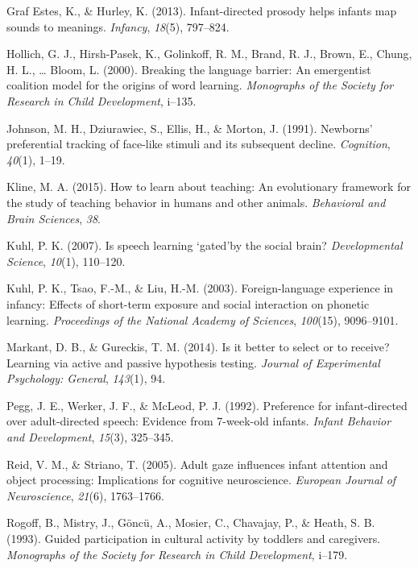 \documentclass[a4paper,man,apacite,floatsintext]{apa6}
\begin{document}
\hypertarget{ref-graf2013infant}{}
Graf Estes, K., \& Hurley, K. (2013). Infant-directed prosody helps
infants map sounds to meanings. \emph{Infancy}, \emph{18}(5), 797--824.

\hypertarget{ref-hollich2000breaking}{}
Hollich, G. J., Hirsh-Pasek, K., Golinkoff, R. M., Brand, R. J., Brown,
E., Chung, H. L., \ldots{} Bloom, L. (2000). Breaking the language
barrier: An emergentist coalition model for the origins of word
learning. \emph{Monographs of the Society for Research in Child
Development}, i--135.

\hypertarget{ref-johnson1991newborns}{}
Johnson, M. H., Dziurawiec, S., Ellis, H., \& Morton, J. (1991).
Newborns' preferential tracking of face-like stimuli and its subsequent
decline. \emph{Cognition}, \emph{40}(1), 1--19.

\hypertarget{ref-kline2015learn}{}
Kline, M. A. (2015). How to learn about teaching: An evolutionary
framework for the study of teaching behavior in humans and other
animals. \emph{Behavioral and Brain Sciences}, \emph{38}.

\hypertarget{ref-kuhl2007speech}{}
Kuhl, P. K. (2007). Is speech learning `gated'by the social brain?
\emph{Developmental Science}, \emph{10}(1), 110--120.

\hypertarget{ref-kuhl2003foreign}{}
Kuhl, P. K., Tsao, F.-M., \& Liu, H.-M. (2003). Foreign-language
experience in infancy: Effects of short-term exposure and social
interaction on phonetic learning. \emph{Proceedings of the National
Academy of Sciences}, \emph{100}(15), 9096--9101.

\hypertarget{ref-markant2014better}{}
Markant, D. B., \& Gureckis, T. M. (2014). Is it better to select or to
receive? Learning via active and passive hypothesis testing.
\emph{Journal of Experimental Psychology: General}, \emph{143}(1), 94.

\hypertarget{ref-pegg1992preference}{}
Pegg, J. E., Werker, J. F., \& McLeod, P. J. (1992). Preference for
infant-directed over adult-directed speech: Evidence from 7-week-old
infants. \emph{Infant Behavior and Development}, \emph{15}(3), 325--345.

\hypertarget{ref-reid2005adult}{}
Reid, V. M., \& Striano, T. (2005). Adult gaze influences infant
attention and object processing: Implications for cognitive
neuroscience. \emph{European Journal of Neuroscience}, \emph{21}(6),
1763--1766.

\hypertarget{ref-rogoff1993guided}{}
Rogoff, B., Mistry, J., Göncü, A., Mosier, C., Chavajay, P., \& Heath,
S. B. (1993). Guided participation in cultural activity by toddlers and
caregivers. \emph{Monographs of the Society for Research in Child
Development}, i--179.
\end{document}
